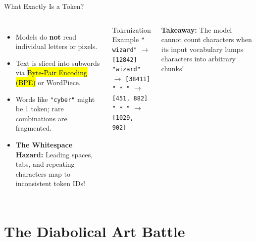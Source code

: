 \documentclass[12pt]{beamer}
\begin{document}
\begin{frame}{What Exactly Is a Token?}
  \begin{columns}[T]
      \begin{itemize}
        \item Models do \textbf{not} read individual letters or pixels.
        \item Text is sliced into subwords via \hl{Byte-Pair Encoding (BPE)} or WordPiece.
        \item Words like \texttt{"cyber"} might be 1 token; rare combinations are fragmented.
        \item \textbf{The Whitespace Hazard:} Leading spaces, tabs, and repeating characters map to inconsistent token IDs!
      \end{itemize}

      \begin{exampleblock}{Tokenization Example}
        \small
        \texttt{" wizard"} $\rightarrow$ \texttt{[12842]} \\
        \texttt{"wizard"} $\rightarrow$ \texttt{[38411]} \\
        \texttt{"  *  "} $\rightarrow$ \texttt{[451, 882]} \\
        \texttt{"   * "} $\rightarrow$ \texttt{[1029, 902]}
      \end{exampleblock}
      \vspace{0.1cm}
      \footnotesize\textcolor{bulletcolor}{\textbf{Takeaway:}} The model cannot count characters when its input vocabulary lumps characters into arbitrary chunks!
  \end{columns}
\end{frame}

\section{The Diabolical Art Battle}
\end{document}
